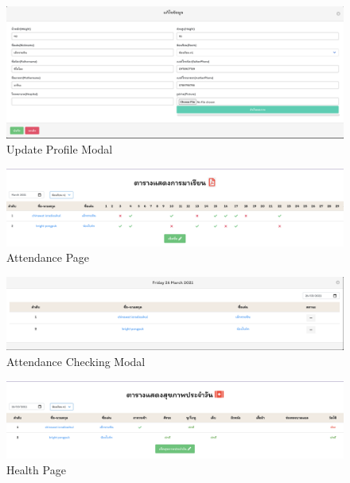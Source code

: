 \begin{figure}
  \begin{center}
  \includegraphics[width=\linewidth]{images/updateProfile.png}
  \end{center}
  \caption[หน้าแก้ไขข้อมูลเด็ก]{Update Profile Modal}
  \label{fig:UpdateProfile}
  \end{figure}
\begin{figure}
  \begin{center}
  \includegraphics[width=\linewidth]{images/Attendance.png}
  \end{center}
  \caption[หน้าแสดงการเข้าเรียนเด็ก]{Attendance Page}
  \label{fig:Attendance}
  \end{figure}

\begin{figure}
  \begin{center}
  \includegraphics[width=\linewidth]{images/checkAttendance.png}
  \end{center}
  \caption[หน้าเช็คชื่อเด็ก]{Attendance Checking Modal}
  \label{fig:CheckAttendance}
  \end{figure}

\begin{figure}
  \begin{center}
  \includegraphics[width=\linewidth]{images/Health.png}
  \end{center}
  \caption[หน้าแสดงข้อมูลสุขภาพเด็กรายวัน]{Health Page}
  \label{fig:Health}
  \end{figure}

